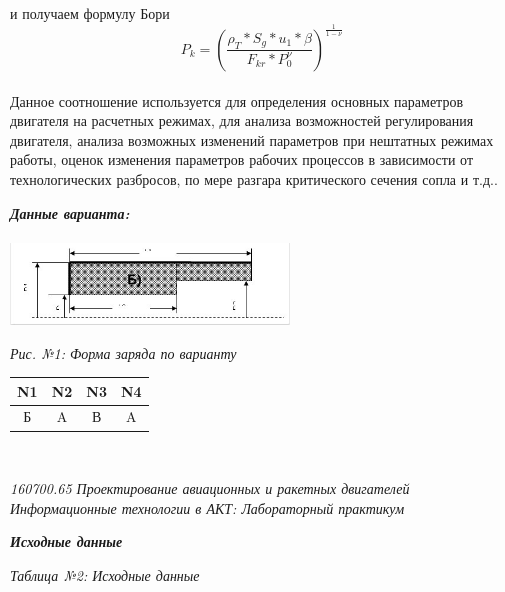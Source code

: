 \documentclass{article}
\begin{document}
и получаем формулу Бори
\begin{equation}\label{eq:fourierrow} 
P_k = {(\frac{\rho_T * S_g * u_1 * \beta}{F_{kr} * P_0^\nu})}^{\frac{1}{1 - \nu}}
\end{equation}\\
Данное соотношение используется для определения основных параметров двигателя на расчетных режимах, для анализа возможностей регулирования двигателя, анализа возможных изменений параметров при нештатных режимах работы, оценок изменения параметров рабочих процессов в зависимости от технологических разбросов, по мере разгара критического сечения сопла и т.д..\\
\begin{center}
\textbf{\textit{Данные варианта:}}\\
~\\
\includegraphics[width=7.4cm]{1} \\
\end{center}
\begin{flushright}
{\textit{Рис. №1: Форма заряда по варианту}}\\
\end{flushright}
\begin{center}
\begin{tabular}{  | c | c | c | c | }
\hline
N1 & N2 & N3 & N4 \\
\hline
Б & A & В & A \\
\hline
\end{tabular}
\end{center}
~\\
\begin{flushright}
\begin{scriptsize}
\textit{160700.65   Проектирование авиационных и ракетных двигателей\\
 Информационные технологии в АКТ: Лабораторный практикум} \\
 \end{scriptsize}
\end{flushright}
\begin{center}
\textbf{\textit{Исходные данные}}\\
\end{center}
\begin{flushright}
\textit{Таблица №2: Исходные данные}\\
\end{flushright}
\end{document}
